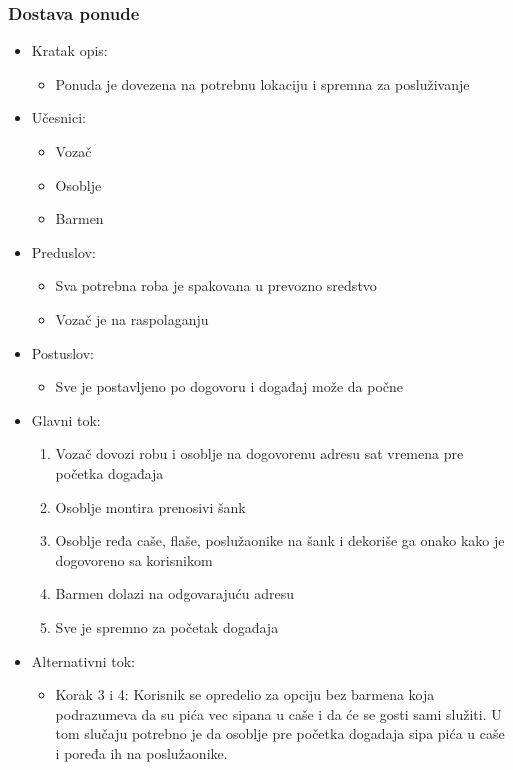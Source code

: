\documentclass[a4paper]{article}
\begin{document}
\subsubsection{Dostava ponude}

\begin{itemize}
    \item Kratak opis:
        \begin{itemize}
            \item Ponuda je dovezena na potrebnu lokaciju i spremna za posluživanje
        \end{itemize}
    \item Učesnici:
        \begin{itemize}
            \item Vozač
            \item Osoblje
            \item Barmen
        \end{itemize}
    \item Preduslov:
        \begin{itemize}
            \item Sva potrebna roba je spakovana u prevozno sredstvo
		    \item Vozač je na raspolaganju	
        \end{itemize}
    \item Postuslov:
        \begin{itemize}
            \item Sve je postavljeno po dogovoru i događaj može da počne
        \end{itemize}
    \item Glavni tok:
        \begin{enumerate}
           \item Vozač dovozi robu i osoblje na dogovorenu adresu sat vremena pre početka događaja 
		    \item Osoblje montira prenosivi šank  
		    \item Osoblje ređa caše, flaše, poslužaonike na šank i dekoriše ga onako kako je dogovoreno sa korisnikom
		    \item Barmen dolazi na odgovarajuću adresu
	        \item Sve je spremno za početak događaja

        \end{enumerate}
    \item Alternativni tok:
        \begin{itemize}
            \item Korak 3 i 4: Korisnik se opredelio za opciju bez barmena koja podrazumeva da su pića vec sipana u caše i da će se gosti sami služiti. U tom slučaju potrebno je da osoblje pre početka dogadaja sipa pića u caše i poređa ih na poslužaonike.
        \end{itemize}
\end{itemize}
\end{document}
